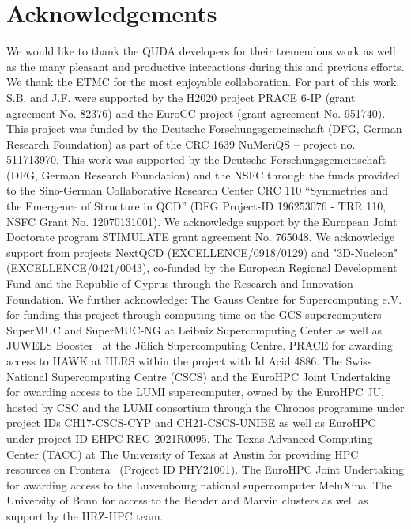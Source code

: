 \documentclass[a4paper,11pt]{article}
\begin{document}
\section{Acknowledgements}
{
\small
We would like to thank the QUDA developers for their tremendous work as well as the many pleasant and productive interactions during this and previous efforts. 
We thank the ETMC for the most enjoyable collaboration. 
For part of this work. S.B. and J.F. were supported by the H2020 project PRACE 6-IP (grant agreement No. 82376) and the EuroCC project (grant agreement No. 951740).
This project was funded by the Deutsche Forschungsgemeinschaft (DFG, German Research Foundation) as part of the CRC 1639 NuMeriQS – project no. 511713970. 
This work was supported by the Deutsche Forschungsgemeinschaft (DFG, German Research Foundation) and the NSFC through the funds provided to the Sino-German Collaborative Research Center CRC 110 “Symmetries and the Emergence of Structure in QCD” (DFG Project-ID 196253076 - TRR 110, NSFC Grant No. 12070131001).
We acknowledge support by the European Joint Doctorate program STIMULATE grant agreement No. 765048.
We acknowledge support from projects NextQCD (EXCELLENCE/0918/0129) and "3D-Nucleon" (EXCELLENCE/0421/0043), co-funded by the European Regional Development Fund and the Republic of Cyprus through the Research and Innovation Foundation. 
We further acknowledge: The Gauss Centre for Supercomputing e.V. for funding this project through computing time on the GCS supercomputers SuperMUC and SuperMUC-NG at Leibniz Supercomputing Center as well as JUWELS Booster~\cite{JUWELS,BOOSTER} at the Jülich Supercomputing Centre.
PRACE for awarding access to HAWK at HLRS within the project with Id Acid 4886. 
The Swiss National Supercomputing Centre (CSCS) and the EuroHPC Joint Undertaking for awarding access to the LUMI supercomputer, owned by the EuroHPC JU, hosted by CSC and the LUMI consortium through the Chronos programme under project IDs CH17-CSCS-CYP and CH21-CSCS-UNIBE as well as EuroHPC under project ID EHPC-REG-2021R0095.
The Texas Advanced Computing Center (TACC) at The University of Texas at Austin for providing HPC resources on Frontera~\cite{FRONTERA} (Project ID PHY21001).
The EuroHPC Joint Undertaking for awarding access to the Luxembourg national supercomputer MeluXina.
The University of Bonn for access to the Bender and Marvin clusters as well as support by the HRZ-HPC team.
}


{\footnotesize

}
\end{document}

